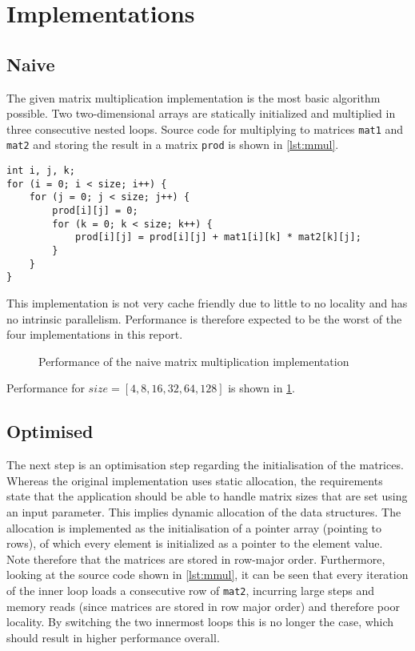 \documentclass[final]{article}
\begin{document}
\section{Implementations}
\label{sec:implementations}

\subsection{Naive}
The given matrix multiplication implementation is the most basic algorithm possible.
Two two-dimensional arrays are statically initialized and multiplied in three consecutive nested loops.
Source code for multiplying to matrices \texttt{mat1} and \texttt{mat2} and storing the result in a matrix \texttt{prod} is shown in \cref{lst:mmul}.

\begin{lstlisting}[style=c, caption=Basic matrix multiplication algorithm, label=lst:mmul]
int i, j, k;
for (i = 0; i < size; i++) {
	for (j = 0; j < size; j++) {
		prod[i][j] = 0;
		for (k = 0; k < size; k++) {
			prod[i][j] = prod[i][j] + mat1[i][k] * mat2[k][j];
		}
	}
}
\end{lstlisting}

This implementation is not very cache friendly due to little to no locality and has no intrinsic parallelism.
Performance is therefore expected to be the worst of the four implementations in this report.

\begin{figure}[H]
	\centering
	
	\caption{Performance of the naive matrix multiplication implementation}
	\label{fig:naive}
\end{figure}

Performance for $size = [4, 8, 16, 32, 64, 128]$ is shown in \cref{fig:naive}.

\subsection{Optimised}
The next step is an optimisation step regarding the initialisation of the matrices.
Whereas the original implementation uses static allocation, the requirements state that the application should be able to handle matrix sizes that are set using an input parameter.
This implies dynamic allocation of the data structures.
The allocation is implemented as the initialisation of a pointer array (pointing to rows), of which every element is initialized as a pointer to the element value.
Note therefore that the matrices are stored in row-major order.
Furthermore, looking at the source code shown in \cref{lst:mmul}, it can be seen that every iteration of the inner loop loads a consecutive row of \texttt{mat2}, incurring large steps and memory reads (since matrices are stored in row major order) and therefore poor locality.
By switching the two innermost loops this is no longer the case, which should result in higher performance overall.
\end{document}
